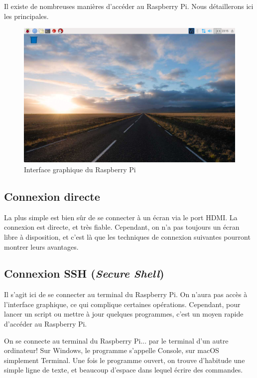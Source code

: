Il existe de nombreuses manières d'accéder au Raspberry Pi. Nous détaillerons ici les principales.

\begin{figure}[h!]
\begin{center}
\includegraphics[width=15cm]{raspi.png}
\end{center}
\caption{Interface graphique du Raspberry Pi}
\label{interface}
\end{figure}

\subsection{Connexion directe}

La plus simple est bien sûr de se connecter à un écran via le port HDMI. La connexion est directe, et très fiable. Cependant, on n'a pas toujours un écran libre à disposition, et c'est là que les techniques de connexion suivantes pourront montrer leurs avantages.

\subsection{Connexion SSH (\textit{Secure Shell})}

Il s'agit ici de se connecter au terminal du Raspberry Pi. On n'aura pas accès à l'interface graphique, ce qui complique certaines opérations. Cependant, pour lancer un script ou mettre à jour quelques programmes, c'est un moyen rapide d'accéder au Raspberry Pi.

On se connecte au terminal du Raspberry Pi... par le terminal d'un autre ordinateur! Sur Windows, le programme s'appelle Console, sur macOS simplement Terminal. Une fois le programme ouvert, on trouve d'habitude une simple ligne de texte, et beaucoup d'espace dans lequel écrire des commandes.

